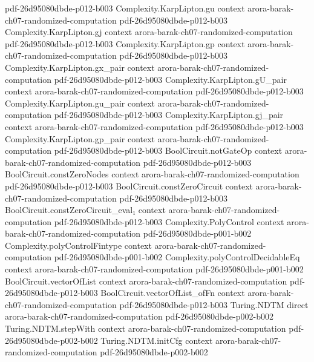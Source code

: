 \begin{theorem}
  {pdf-26d95080dbde-p012-b003}
\proofstep
  {Complexity.KarpLipton.gu}
  {context}
  {arora-barak-ch07-randomized-computation}
  {pdf-26d95080dbde-p012-b003}
\proofstep
  {Complexity.KarpLipton.gj}
  {context}
  {arora-barak-ch07-randomized-computation}
  {pdf-26d95080dbde-p012-b003}
\proofstep
  {Complexity.KarpLipton.gp}
  {context}
  {arora-barak-ch07-randomized-computation}
  {pdf-26d95080dbde-p012-b003}
\proofstep
  {Complexity.KarpLipton.gx_pair}
  {context}
  {arora-barak-ch07-randomized-computation}
  {pdf-26d95080dbde-p012-b003}
\proofstep
  {Complexity.KarpLipton.gU_pair}
  {context}
  {arora-barak-ch07-randomized-computation}
  {pdf-26d95080dbde-p012-b003}
\proofstep
  {Complexity.KarpLipton.gu_pair}
  {context}
  {arora-barak-ch07-randomized-computation}
  {pdf-26d95080dbde-p012-b003}
\proofstep
  {Complexity.KarpLipton.gj_pair}
  {context}
  {arora-barak-ch07-randomized-computation}
  {pdf-26d95080dbde-p012-b003}
\proofstep
  {Complexity.KarpLipton.gp_pair}
  {context}
  {arora-barak-ch07-randomized-computation}
  {pdf-26d95080dbde-p012-b003}
\proofstep
  {BoolCircuit.notGateOp}
  {context}
  {arora-barak-ch07-randomized-computation}
  {pdf-26d95080dbde-p012-b003}
\proofstep
  {BoolCircuit.constZeroNodes}
  {context}
  {arora-barak-ch07-randomized-computation}
  {pdf-26d95080dbde-p012-b003}
\proofstep
  {BoolCircuit.constZeroCircuit}
  {context}
  {arora-barak-ch07-randomized-computation}
  {pdf-26d95080dbde-p012-b003}
\proofstep
  {BoolCircuit.constZeroCircuit_eval₁}
  {context}
  {arora-barak-ch07-randomized-computation}
  {pdf-26d95080dbde-p012-b003}
\proofstep
  {Complexity.PolyControl}
  {context}
  {arora-barak-ch07-randomized-computation}
  {pdf-26d95080dbde-p001-b002}
\proofstep
  {Complexity.polyControlFintype}
  {context}
  {arora-barak-ch07-randomized-computation}
  {pdf-26d95080dbde-p001-b002}
\proofstep
  {Complexity.polyControlDecidableEq}
  {context}
  {arora-barak-ch07-randomized-computation}
  {pdf-26d95080dbde-p001-b002}
\proofstep
  {BoolCircuit.vectorOfList}
  {context}
  {arora-barak-ch07-randomized-computation}
  {pdf-26d95080dbde-p012-b003}
\proofstep
  {BoolCircuit.vectorOfList_ofFn}
  {context}
  {arora-barak-ch07-randomized-computation}
  {pdf-26d95080dbde-p012-b003}
\proofstep
  {Turing.NDTM}
  {direct}
  {arora-barak-ch07-randomized-computation}
  {pdf-26d95080dbde-p002-b002}
\proofstep
  {Turing.NDTM.stepWith}
  {context}
  {arora-barak-ch07-randomized-computation}
  {pdf-26d95080dbde-p002-b002}
\proofstep
  {Turing.NDTM.initCfg}
  {context}
  {arora-barak-ch07-randomized-computation}
  {pdf-26d95080dbde-p002-b002}

\end{theorem}
